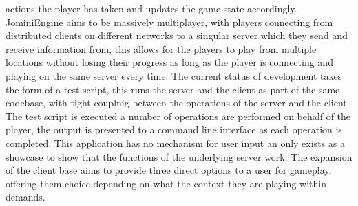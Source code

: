 \documentclass{article}
\begin{document}
actions the player has taken and updates the game state accordingly. JominiEngine aims to be massively multiplayer, with players connecting from distributed clients on different networks to a singular server which they send and receive information from, this allows for the players to play from multiple locations without losing their progress as long as the player is connecting and playing on the same server every time. The current status of development takes the form of a test script, this runs the server and the client as part of the same codebase, with tight couplnig between the operations of the server and the client. The test script is executed a number of operations are performed on behalf of the player, the output is presented to a command line interface as each operation is completed. This application has no mechanism for user input an only exists as a showcase to show that the functions of the underlying server work. The expansion of the client base aims to provide three direct options to a user for gameplay, offering them choice depending on what the context they are playing within demands.
\end{document}
